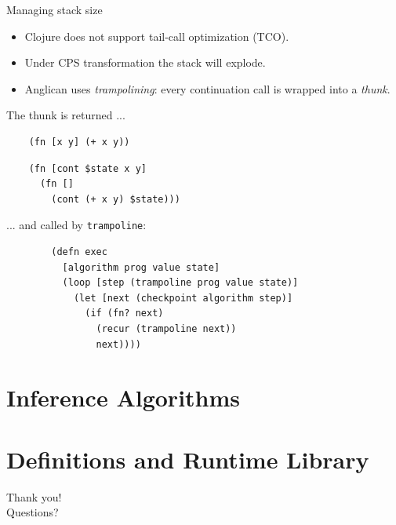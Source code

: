 \documentclass{beamer}
\begin{document}
\begin{frame}[fragile]{Managing stack size}
    \begin{itemize}
        \item Clojure does not support tail-call optimization (TCO).
        \item Under CPS transformation the stack will explode.
            \pause
        \item Anglican uses \textit{trampolining}: every continuation
            call is wrapped into a \textit{thunk}.
    \end{itemize}

    The thunk is returned ...

    \begin{minipage}{0.48\textwidth}
\begin{verbatim}
    (fn [x y] (+ x y))
\end{verbatim}
    \end{minipage}
    \begin{minipage}{0.48\textwidth}
        \vspace{0.5em}
\begin{verbatim}
    (fn [cont $state x y] 
      (fn []
        (cont (+ x y) $state)))
\end{verbatim}
      \vspace{0.5em}
    \end{minipage}

    ... and  called by \texttt{trampoline}:

\begin{verbatim}
        (defn exec
          [algorithm prog value state]
          (loop [step (trampoline prog value state)]
            (let [next (checkpoint algorithm step)]
              (if (fn? next)
                (recur (trampoline next))
                next))))
\end{verbatim}

\end{frame}

\section{Inference Algorithms}

\section{Definitions and Runtime Library}

\begin{frame}
    \LARGE
    \center
    Thank you!\\Questions?
\end{frame}
\end{document}
